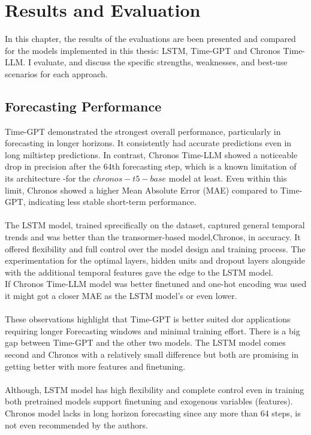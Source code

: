 \documentclass{article}
\begin{document}
\section{Results and Evaluation}
In this chapter, the results of the evaluations are been presented and compared for the models implemented in this thesis: LSTM, Time-GPT and Chronos Time-LLM. I evaluate, and discuss the specific strengths, weaknesses, and best-use scenarios for each approach.

\subsection{Forecasting Performance}
Time-GPT demonstrated the strongest overall performance, particularly in forecasting in longer horizons. It consistently had accurate predictions even in long miltistep predictions. In contrast, Chronos Time-LLM showed a noticeable drop in precision after the 64th forecasting step, which is a known limitation of its architecture -for the $chronos-t5-base$ model at least. Even within this limit, Chronos showed a higher Mean Absolute Error (MAE) compared to Time-GPT, indicating less stable short-term performance. \\
\\
The LSTM model, trained sprecifically on the dataset, captured general temporal trends and was better than the transormer-based model,Chronos, in accuracy. It offered flexibility and full control over the model design and training process. The experimentation for the optimal layers, hidden units and dropout layers alongside with the additional temporal features gave the edge to the LSTM model.\\
If Chronos Time-LLM model was better finetuned and one-hot encoding was used it might got a closer MAE as the LSTM model's or even lower.\\
\\
These observations highlight that Time-GPT is better suited dor applications requiring longer Forecasting windows and minimal training effort. There is a big gap between Time-GPT and the other two models. The LSTM model comes second and Chronos with a relatively small difference but both are promising in getting better with more features and finetuning.\\
\\
Although, LSTM model has high flexibility and complete control even in training both pretrained models support finetuning and exogenous variables (features).\\
Chronos model lacks in long horizon forecasting since any more than 64 steps, is not even recommended by the authors.
\end{document}
